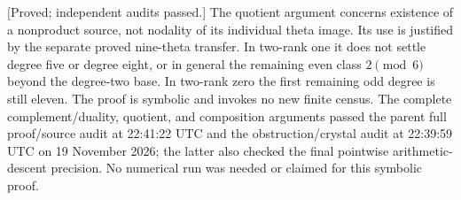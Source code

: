 \begin{remark}
\label{rem:nonordinary-arbitrary-odd-neighbor-scope-candidate}
\textup{[Proved; independent audits passed.]}
The quotient argument concerns existence of a nonproduct source,
not nodality of its individual theta image. Its use is justified
by the separate proved nine-theta transfer. In two-rank one it
does not settle degree five or degree eight, or in general the
remaining even class $2\pmod6$ beyond the degree-two base. In
two-rank zero the first remaining odd degree is still eleven.
The proof is symbolic and invokes no new finite census. The complete complement/duality, quotient, and composition
arguments passed the parent full proof/source audit at
22:41:22 UTC and the obstruction/crystal audit at 22:39:59 UTC
on 19 November 2026; the latter also checked the final
pointwise arithmetic-descent precision. No numerical run
was needed or claimed for this symbolic proof.
\end{remark}
